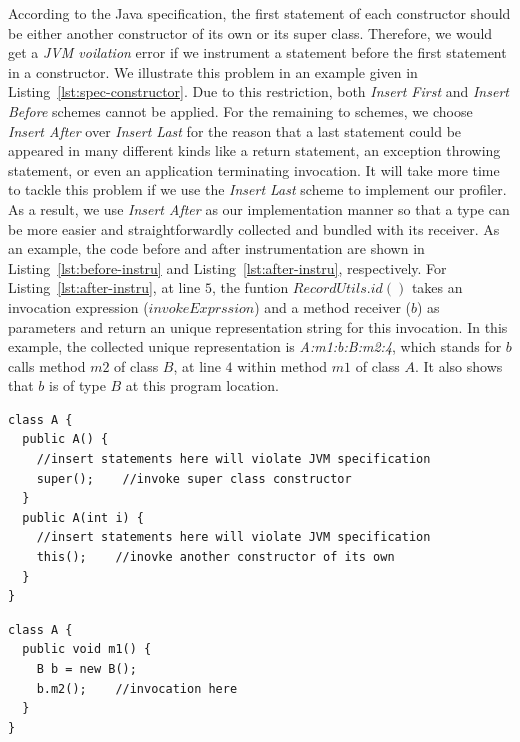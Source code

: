 \documentclass{fac}
\begin{document}
According to the Java specification, the first statement of each constructor should be either another constructor of its own or its super class. Therefore, we would get a \emph{JVM voilation} error if we instrument a statement before the first statement in a constructor. We illustrate this problem in an example given in Listing~\ref{lst:spec-constructor}. Due to this restriction, both \emph{Insert First} and \emph{Insert Before} schemes cannot be applied. For the remaining to schemes, we choose \emph{Insert After} over \emph{Insert Last} for the reason that a last statement could be appeared in many different kinds like a return statement, an exception throwing statement, or even an application terminating invocation. It will take more time to tackle this problem if we use the  \emph{Insert Last} scheme to implement our profiler. As a result, we use \emph{Insert After} as our implementation manner so that a type can be more easier and straightforwardly collected and bundled with its receiver. %
As an example, the code before and after instrumentation are shown in Listing~\ref{lst:before-instru} and Listing~\ref{lst:after-instru}, respectively. For Listing~\ref{lst:after-instru}, at line $5$, the funtion $RecordUtils.id()$ takes an invocation expression ($invokeExprssion$) and a method receiver ($b$) as parameters and return an unique representation string for this invocation. In this example, the collected unique representation is \emph{A:m1:b:B:m2:4}, which stands for $b$ calls method $m2$ of class $B$, at line $4$ within method $m1$ of class $A$. It also shows that $b$ is of type $B$ at this program location.

\begin{minipage}{\linewidth}
\vspace{10pt}
\begin{lstlisting}[caption={Java specification on constructor},label={lst:spec-constructor}]
class A {
  public A() {
    //insert statements here will violate JVM specification
    super();	//invoke super class constructor
  }
  public A(int i) {
    //insert statements here will violate JVM specification
    this();    //inovke another constructor of its own
  }
}
\end{lstlisting}
\end{minipage}

\begin{minipage}{\linewidth}
\vspace{10pt}
\begin{lstlisting}[caption={Example code before instrumentation},label={lst:before-instru}]
class A {
  public void m1() {
    B b = new B();
    b.m2();    //invocation here
  }
}
\end{lstlisting}
\end{minipage}
\end{document}
